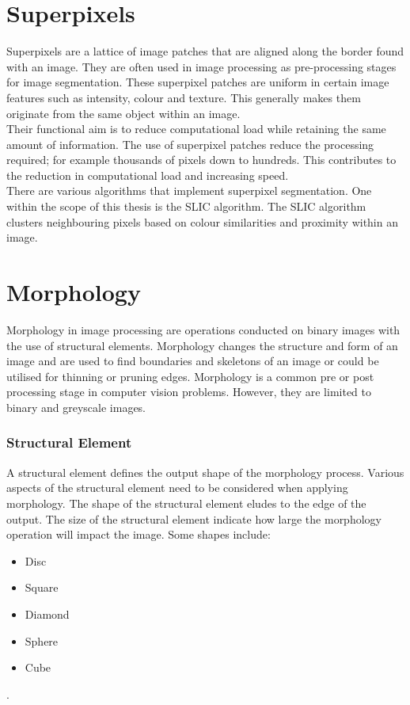 \section{Superpixels}
Superpixels are a lattice of image patches that are aligned along the border found with an image. They are often used in image processing as pre-processing stages for image segmentation. These superpixel patches are uniform in certain image features such as intensity, colour and texture. This generally makes them originate from the same object within an image. \cite{ref:sp_2}
\\[1\baselineskip]
Their functional aim is to reduce computational load while retaining the same amount of information. The use of superpixel patches reduce the processing required; for example thousands of pixels down to hundreds. This contributes to the reduction in computational load and increasing speed. 
\\[1\baselineskip]
There are various algorithms that implement superpixel segmentation. One within the scope of this thesis is the SLIC algorithm. The SLIC algorithm clusters neighbouring pixels based on colour similarities and proximity within an image. \cite{ref:sp_1}
 
\section{Morphology}
Morphology in image processing are operations conducted on binary images with the use of structural elements. Morphology changes the structure and form of an image and are used to find boundaries and skeletons of an image or could be utilised for thinning or pruning edges. Morphology is a common pre or post processing stage in computer vision problems. However, they are limited to binary and greyscale images. 
\subsubsection{Structural Element}
A structural element defines the output shape of the morphology process. Various aspects of the structural element need to be considered when applying morphology. The shape of the structural element eludes to the edge of the output. The size of the structural element indicate how large the morphology operation will impact the image. Some shapes include:
\begin{itemize}
	\item Disc
	\item Square
	\item Diamond
	\item Sphere
	\item Cube
\end{itemize}
 \cite{ref:morph_3}.
